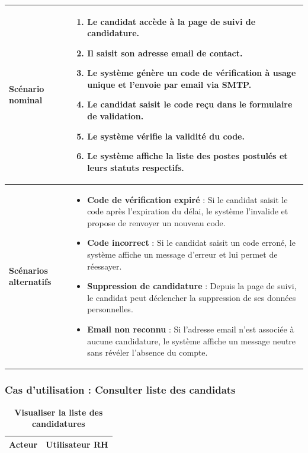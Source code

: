 \documentclass[12pt,a4paper,oneside]{report}
\begin{document}
\begin{itemize}
\begin{xltabular}{\textwidth}{|l|X|}
    \textbf{Scénario nominal} & 
    \begin{enumerate}[leftmargin=*, nosep]
        \item Le candidat accède à la page de suivi de candidature.
        \item Il saisit son adresse email de contact.
        \item Le système génère un code de vérification à usage unique et l'envoie par email via SMTP.
        \item Le candidat saisit le code reçu dans le formulaire de validation.
        \item Le système vérifie la validité du code.
        \item Le système affiche la liste des postes postulés et leurs statuts respectifs.
    \end{enumerate} \\ \hline
    
    \textbf{Scénarios alternatifs} & 
    \begin{itemize}[leftmargin=*, nosep]
        \item \textbf{Code de vérification expiré} : Si le candidat saisit le code après l'expiration du délai, le système l'invalide et propose de renvoyer un nouveau code.
        \item \textbf{Code incorrect} : Si le candidat saisit un code erroné, le système affiche un message d'erreur et lui permet de réessayer.
        \item \textbf{Suppression de candidature} : Depuis la page de suivi, le candidat peut déclencher la suppression de ses données personnelles.
        \item \textbf{Email non reconnu} : Si l'adresse email n'est associée à aucune candidature, le système affiche un message neutre sans révéler l'absence du compte.
    \end{itemize} \\ \hline
\end{xltabular}

\subsubsection{Cas d'utilisation : Consulter liste des candidats}
\renewcommand{\arraystretch}{1.5}

\begin{xltabular}{\textwidth}{|l|X|}
    \caption{\textbf{Visualiser la liste des candidatures}} \label{tab:visualisation_candidatures} \\
    \hline
    \textbf{Acteur} & Utilisateur RH \\ \hline
    


\end{xltabular}
\end{itemize}
\end{document}
